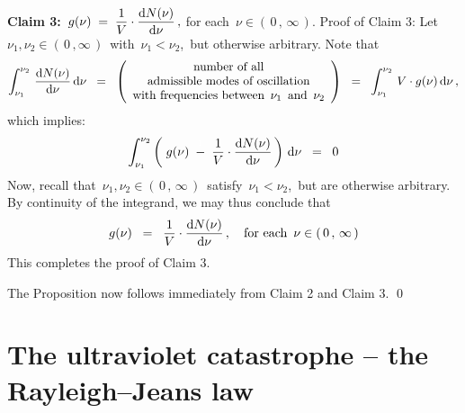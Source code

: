 \vskip 0.4cm
\noindent
\textbf{Claim 3:}\;\,
$
g(\nu)
\; = \;
    \dfrac{1}{V}\cdot\dfrac{\textnormal{d} N(\nu)}{\textnormal{d}\nu}\,,
$\;\;
for each \,$\nu \in (\,0\,,\,\infty\,)$.
\vskip 0.2cm
\noindent
Proof of Claim 3:\;
Let \,$\nu_{1}, \nu_{2} \in (\,0\,,\infty\,)$\,
with \,$\nu_{1} < \nu_{2}$,\, but otherwise arbitrary.
Note that
\begin{equation*}
\int_{\nu_{1}}^{\nu_{2}}\, \dfrac{\textnormal{d} N(\nu)}{\textnormal{d}\nu} \,\textnormal{d}\nu
\;\; = \;\;
    \left(\begin{array}{c}
        \textnormal{number of all}
        \\
        \textnormal{admissible modes of oscillation}
        \\
        \textnormal{with frequencies between \,$\nu_{1}$\, and \,$\nu_{2}$}
        \end{array}\right)
\;\; = \;\;
    \int_{\nu_{1}}^{\nu_{2}}\, V \cdot g(\nu) \,\textnormal{d}\nu\,,
\end{equation*}
which implies:
\begin{equation*}
\int_{\nu_{1}}^{\nu_{2}}
\left(\;
    g(\nu)
    \; \overset{{\color{white}1}}{-} \;
    \dfrac{1}{V}\cdot\dfrac{\d N(\nu)}{\d\nu}
    \,\right)\,\d\nu
\;\; = \;\;
    0
\end{equation*}
Now, recall that \,$\nu_{1}, \nu_{2} \in (\,0\,,\,\infty\,)$\,
satisfy
\,$\nu_{1} < \nu_{2}$,\,
but are otherwise arbitrary.
By continuity of the integrand, we may thus conclude that
\begin{equation*}
g(\nu)
\;\; = \;\;
    \dfrac{1}{V}\cdot\dfrac{\textnormal{d} N(\nu)}{\textnormal{d}\nu}\,,
\quad
\textnormal{for each \,$\nu \in (\,0\,,\,\infty\,)$}
\end{equation*}
This completes the proof of Claim 3.

\vskip 0.4cm
\noindent
The Proposition now follows immediately from Claim 2 and Claim 3.
\qed


\vskip 0.5cm
\section{The ultraviolet catastrophe -- the Rayleigh–Jeans law}


